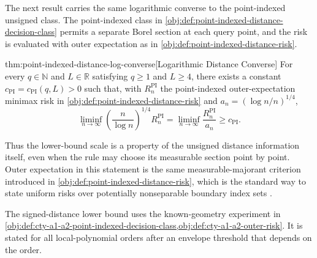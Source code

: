 The next result carries the same logarithmic converse to the point-indexed unsigned class. The point-indexed class in \cref{obj:def:point-indexed-distance-decision-class} permits a separate Borel section at each query point, and the risk is evaluated with outer expectation as in \cref{obj:def:point-indexed-distance-risk}.

\begin{theoremv}{thm:point-indexed-distance-log-converse}[Logarithmic Distance Converse]
For every \(q\in\mathbb N\) and \(L\in\mathbb R\) satisfying \(q\geq 1\) and \(L\geq 4\), there exists a constant \(c_{\mathrm{PI}}=c_{\mathrm{PI}}(q,L)>0\) such that, with \(R_n^{\mathrm{PI}}\) the point-indexed outer-expectation minimax risk in \cref{obj:def:point-indexed-distance-risk} and \(a_n=(\log n/n)^{1/4}\),
\[
\liminf_{n\to\infty}
\left(\frac{n}{\log n}\right)^{1/4} R_n^{\mathrm{PI}}
=
\liminf_{n\to\infty}
\frac{R_n^{\mathrm{PI}}}{a_n}
\geq c_{\mathrm{PI}}.
\]
\end{theoremv}

Thus the lower-bound scale is a property of the unsigned distance information itself, even when the rule may choose its measurable section point by point. Outer expectation in this statement is the same measurable-majorant criterion introduced in \cref{obj:def:point-indexed-distance-risk}, which is the standard way to state uniform risks over potentially nonseparable boundary index sets \citep{VanderVaart1996}.

The signed-distance lower bound uses the known-geometry experiment in \cref{obj:def:cty-a1-a2-point-indexed-decision-class,obj:def:cty-a1-a2-outer-risk}. It is stated for all local-polynomial orders after an envelope threshold that depends on the order.

